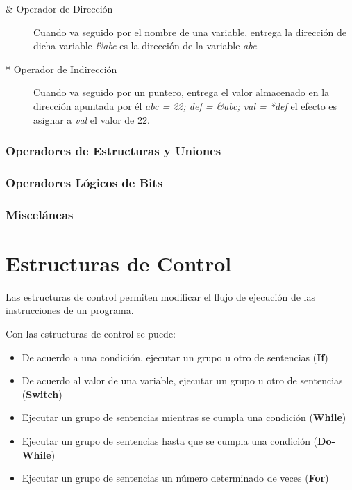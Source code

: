 \begin{description}
\item [\& Operador de Dirección] Cuando va seguido por el nombre de una variable, entrega la dirección de dicha variable \textit{\&abc} es la dirección de la variable \textit{abc}.
\item [* Operador de Indirección] Cuando va seguido por un puntero, entrega el valor almacenado en la dirección apuntada por él \textit{abc = 22; def = \&abc; val = *def} el efecto es asignar a \textit{val} el valor de 22.
\end{description}

\subsubsection{Operadores de Estructuras y Uniones}

\subsubsection{Operadores Lógicos de Bits}
\subsubsection{Misceláneas}







\section{Estructuras de Control}

Las estructuras de control permiten modificar el flujo de ejecución de las instrucciones de un programa.

Con las estructuras de control se puede:

\begin{itemize}
\item De acuerdo a una condición, ejecutar un grupo u otro de sentencias (\textbf{If})
\item De acuerdo al valor de una variable, ejecutar un grupo u otro de sentencias (\textbf{Switch})
\item Ejecutar un grupo de sentencias mientras se cumpla una condición (\textbf{While})
\item Ejecutar un grupo de sentencias hasta que se cumpla una condición (\textbf{Do-While})
\item Ejecutar un grupo de sentencias un número determinado de veces (\textbf{For})
\end{itemize}

